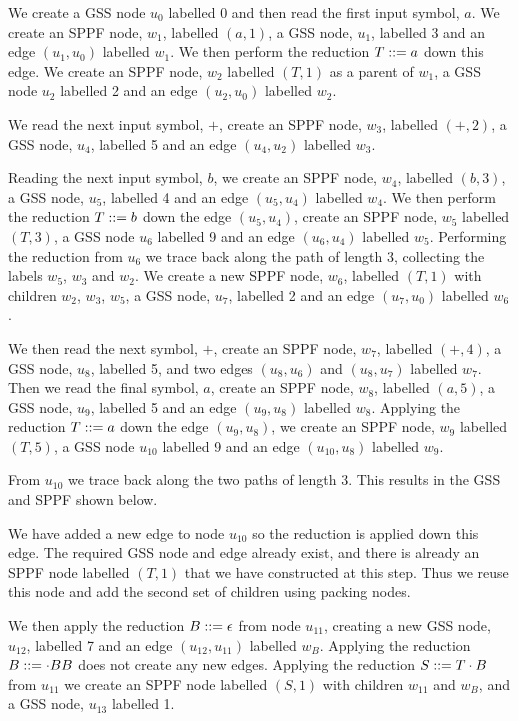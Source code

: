 We create a GSS node $u_0$ labelled 0 and then read the first input
symbol, $a$. We create an SPPF node, $w_1$, labelled $(a,1)$, a GSS
node, $u_1$, labelled $3$ and an edge $(u_1,u_0)$ labelled $w_1$.
We then perform the reduction $T::= a$ down this edge. We create an
SPPF node, $w_2$ labelled $(T,1)$ as a parent of $w_1$, 
a GSS node $u_2$ labelled 2 and an edge $(u_2,u_0)$ labelled $w_2$.
\begin{center}
\footnotesize

\end{center}
We read the next input symbol, $+$, create an SPPF node, $w_3$,
labelled $(+,2)$, a GSS node, $u_4$, labelled 5 and an edge $(u_4,u_2)$
labelled $w_3$.

Reading the next input symbol, $b$, we create an SPPF node, $w_4$,
labelled $(b,3)$, a GSS node, $u_5$, labelled 4 and an edge $(u_5,u_4)$
labelled $w_4$. We then perform the reduction $T::= b$ down the
edge $(u_5,u_4)$, create an SPPF node, $w_5$ labelled $(T,3)$, a GSS node 
$u_6$ labelled 9 and an edge $(u_6,u_4)$ labelled $w_5$.
Performing the reduction from $u_6$ we trace back along the path of
length 3, collecting the labels $w_5$, $w_3$ and $w_2$. We create a
new SPPF node, $w_6$, labelled $(T,1)$ with children $w_2$, $w_3$,
$w_5$, a GSS node, $u_7$, labelled 2
and an edge $(u_7,u_0)$ labelled $w_6$.
\begin{center}
\footnotesize

\end{center}

We then read the next symbol, $+$, create an SPPF node, $w_7$, labelled 
$(+,4)$, a GSS node, $u_8$, labelled 5, and two edges $(u_8,u_6)$ and 
$(u_8,u_7)$ labelled $w_7$. Then we read the final symbol, $a$,
create an SPPF node, $w_8$,
labelled $(a,5)$, a GSS node, $u_9$, labelled 5 and an edge $(u_9,u_8)$
labelled $w_8$. Applying the reduction $T::= a$ down the
edge $(u_9,u_8)$, we create an SPPF node, $w_{9}$ labelled $(T,5)$, a GSS node 
$u_{10}$ labelled 9 and an edge $(u_{10},u_8)$ labelled $w_9$.
\begin{center}
\footnotesize

\end{center}
From $u_{10}$ we trace back along the two paths of length 3. This
results in the GSS and SPPF shown below.
\begin{center}
\footnotesize

\end{center}
We have added a new edge to node $u_{10}$ so the reduction is applied
down this edge. The required GSS node and edge already exist, and
there is already an SPPF node labelled $(T,1)$ that we have
constructed at this step. Thus we reuse this node and add the second
set of children using packing nodes.
\begin{center}
\footnotesize

\end{center}
We then apply the reduction $B::=\epsilon$ from node $u_{11}$, creating
a new GSS node, $u_{12}$, labelled 7 and an edge $(u_{12},u_{11})$ labelled
$w_B$. Applying the reduction $B::=\cdot BB$ does not create any new
edges. Applying the reduction $S::= T\cdot B$ from $u_{11}$ we
create an SPPF node labelled $(S,1)$ with children $w_{11}$ and $w_B$,
and a GSS node, $u_{13}$ labelled 1.

